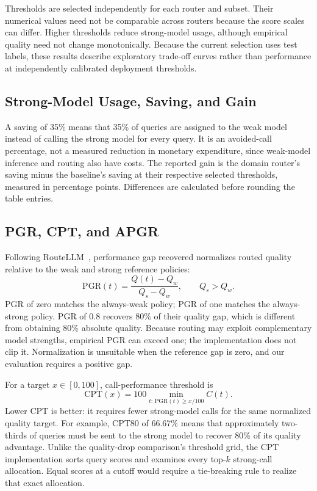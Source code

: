 \documentclass[conference]{IEEEtran}
\begin{document}
Thresholds are selected independently for each router and subset. Their numerical values need not be comparable across routers because the score scales can differ. Higher thresholds reduce strong-model usage, although empirical quality need not change monotonically. Because the current selection uses test labels, these results describe exploratory trade-off curves rather than performance at independently calibrated deployment thresholds.

\subsection{Strong-Model Usage, Saving, and Gain}
A saving of 35\% means that 35\% of queries are assigned to the weak model instead of calling the strong model for every query. It is an avoided-call percentage, not a measured reduction in monetary expenditure, since weak-model inference and routing also have costs. The reported gain is the domain router's saving minus the baseline's saving at their respective selected thresholds, measured in percentage points. Differences are calculated before rounding the table entries.

\subsection{PGR, CPT, and APGR}
Following RouteLLM~\cite{ong2024routellm}, performance gap recovered normalizes routed quality relative to the weak and strong reference policies:
\begin{equation}
\mathrm{PGR}(t)=\frac{Q(t)-Q_w}{Q_s-Q_w},\qquad Q_s>Q_w.
\end{equation}
PGR of zero matches the always-weak policy; PGR of one matches the always-strong policy. PGR of 0.8 recovers 80\% of their quality gap, which is different from obtaining 80\% absolute quality. Because routing may exploit complementary model strengths, empirical PGR can exceed one; the implementation does not clip it. Normalization is unsuitable when the reference gap is zero, and our evaluation requires a positive gap.

For a target $x\in[0,100]$, call-performance threshold is
\begin{equation}
\mathrm{CPT}(x)=100\min_{t:\,\mathrm{PGR}(t)\geq x/100}C(t).
\end{equation}
Lower CPT is better: it requires fewer strong-model calls for the same normalized quality target. For example, CPT80 of 66.67\% means that approximately two-thirds of queries must be sent to the strong model to recover 80\% of its quality advantage. Unlike the quality-drop comparison's threshold grid, the CPT implementation sorts query scores and examines every top-$k$ strong-call allocation. Equal scores at a cutoff would require a tie-breaking rule to realize that exact allocation.
\end{document}
